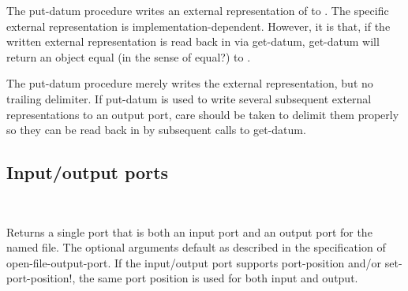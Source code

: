 \begin{entry}{%
}

The {\cf put-datum} procedure writes an external representation of
 to .
The specific external representation is implementation-dependent.
However, it is that, if the written external representation is read
back in via {\cf get-datum}, {\cf get-datum} will return an object
equal (in the sense of {\cf equal?}) to .

\begin{note}
  The {\cf put-datum} procedure merely writes the external
  representation, but no trailing delimiter.  If {\cf put-datum} is
  used to write several subsequent external representations to an
  output port, care should be taken to delimit them properly so they can
  be read back in by subsequent calls to {\cf get-datum}.
\end{note}
\end{entry}


\subsection{Input/output ports}

\begin{entry}{%
\\
}
   
Returns a single port that is both an input port and an
output port for the named file.
The optional arguments default as described in the specification
of {\cf open-file-output-port}.
If the input/output port supports {\cf port-position} and/or
{\cf set-port-position!}, the same port position is used
for both input and output.
\end{entry}

